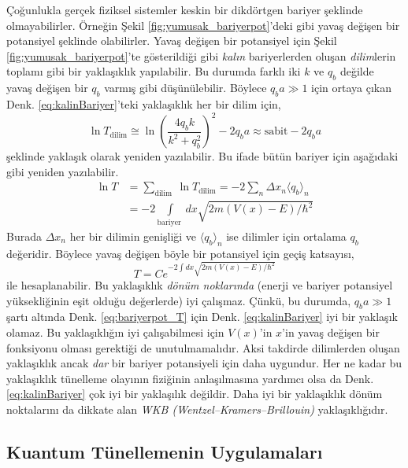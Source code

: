\documentclass[00_kitap.tex]{subfiles}
\begin{document}
Çoğunlukla gerçek fiziksel sistemler keskin bir dikdörtgen bariyer şeklinde olmayabilirler. Örneğin Şekil \ref{fig:yumusak_bariyerpot}'deki gibi yavaş değişen bir potansiyel şeklinde olabilirler. Yavaş değişen bir potansiyel için Şekil \ref{fig:yumusak_bariyerpot}'te gösterildiği gibi \emph{kalın} bariyerlerden oluşan \emph{dilim}lerin toplamı gibi bir yaklaşıklık yapılabilir. Bu durumda farklı iki $k$ ve $q_b$ değilde yavaş değişen bir $q_b$ varmış gibi düşünülebilir. Böylece $q_b a \gg 1$ için ortaya çıkan Denk. \ref{eq:kalinBariyer}'teki yaklaşıklık her bir dilim için,
\begin{equation}
\ln T_\text{dilim} \cong \ln \left(\frac{4 q_b k}{k^{2}+ q_b^{2}}\right)^{2}-2 q_b a \approx \mathrm{sabit}-2 q_b a
\end{equation}
şeklinde yaklaşık olarak yeniden yazılabilir. Bu ifade bütün bariyer için aşağıdaki gibi yeniden yazılabilir.
\begin{align} 
\ln T &=\sum_{\text {dilim }} \ln T_{\text{dilim}}=-2 \sum_{n} \Delta x_{n}\langle q_b\rangle_{n} \nonumber\\ 
&=-2 \int\limits_{\text {bariyer }} dx\sqrt{2 m(V(x)-E) / \hbar^{2}} 
\end{align}
Burada $\Delta x_{n}$ her bir dilimin genişliği ve $\langle q_b\rangle_{n}$ ise dilimler için ortalama $q_b$ değeridir. Böylece yavaş değişen böyle bir potansiyel için geçiş katsayısı,
\begin{equation}
T=C e^{-2 \int d x \sqrt{2 m(V(x)-E) / \hbar^{2}}}
\end{equation}
ile hesaplanabilir. Bu yaklaşıklık \emph{dönüm noklarında} (enerji ve bariyer potansiyel yüksekliğinin eşit olduğu değerlerde) iyi çalışmaz. Çünkü, bu durumda, $q_b a \gg 1$ şartı altında Denk. \ref{eq:bariyerpot_T} için Denk. \ref{eq:kalinBariyer} iyi bir yaklaşık olamaz.
Bu yaklaşıklığın iyi çalışabilmesi için $V(x)$'in $x$'in yavaş değişen bir fonksiyonu olması gerektiği de unutulmamalıdır. Aksi takdirde dilimlerden oluşan yaklaşıklık ancak \emph{dar} bir bariyer potansiyeli için daha uygundur. Her ne kadar bu yaklaşıklık tünelleme olayının fiziğinin anlaşılmasına yardımcı olsa da Denk. \ref{eq:kalinBariyer} çok iyi bir yaklaşılık değildir. Daha iyi bir yaklaşıklık dönüm noktalarını da dikkate alan \emph{WKB (Wentzel–Kramers–Brillouin)} yaklaşıklığıdır.

\subsection{Kuantum Tünellemenin Uygulamaları}
\end{document}
